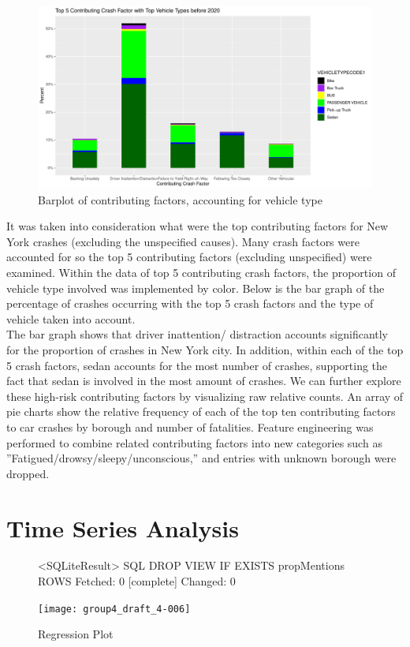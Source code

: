 \documentclass[10pt]{article}
\begin{document}
\begin{figure}[H]
\centering
\includegraphics{group4_draft_4-005}
\caption{Barplot of contributing factors, accounting for vehicle type}
\end{figure}
It was taken into consideration what were the top contributing factors for New York crashes (excluding the unspecified causes). Many crash factors were accounted for so the top 5 contributing factors (excluding unspecified) were examined. Within the data of top 5 contributing crash factors, the proportion of vehicle type involved was implemented by color. Below is the bar graph of the percentage of crashes occurring with the top 5 crash factors and the type of vehicle taken into account.\\
\noindent
The bar graph shows that driver inattention/ distraction accounts significantly for the proportion of crashes in New York city. In addition, within each of the top 5 crash factors, sedan accounts for the most number of crashes, supporting the fact that sedan is involved in the most amount of crashes. We can further explore these high-risk contributing factors by visualizing raw relative counts. An array of pie charts show the relative frequency of each of the top ten contributing factors to car crashes by borough and number of fatalities. Feature engineering was performed to combine related contributing factors into new categories such as ”Fatigued/drowsy/sleepy/unconscious,” and entries with unknown borough were dropped.

\section{Time Series Analysis}
\begin{figure}[H]
\centering
\begin{Schunk}
\begin{Soutput}
<SQLiteResult>
  SQL  DROP VIEW IF EXISTS propMentions
  ROWS Fetched: 0 [complete]
       Changed: 0
\end{Soutput}
\end{Schunk}
\texttt{[image: group4\_draft\_4-006]}
\caption{Regression Plot}
\end{figure}
\end{document}
